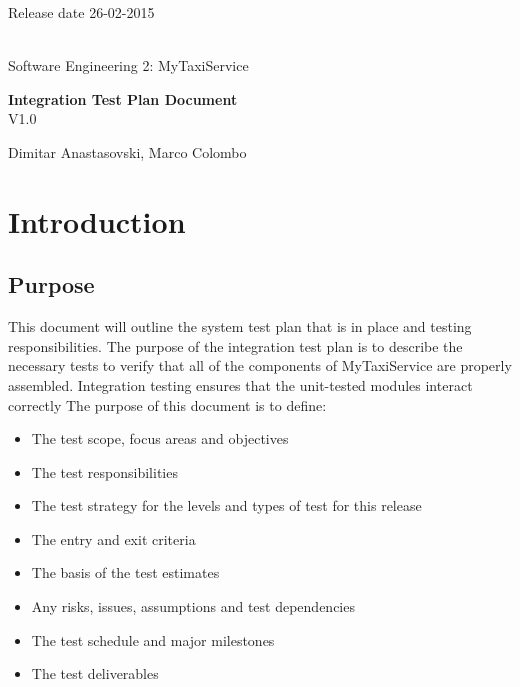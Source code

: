 \documentclass[12pt, oneside]{book}   	%
\begin{document}
\thispagestyle{empty}
\hspace{10cm}
Release date 26-02-2015
\\
\\
\begin{center}
{\huge Software Engineering 2:}
{\huge MyTaxiService}
\end{center}
\vspace*{\fill}
\begin{center}
\textbf{\huge Integration Test Plan Document} 
\\
\large{V1.0}
\end{center}
\vfill
\begin{center}
{\large Dimitar Anastasovski, Marco Colombo}
\end{center}
\clearpage
\pagestyle{plain}
\tableofcontents
\setcounter{page}{1}
\clearpage
\chapter{Introduction}
\section{Purpose}
This document will outline the system test plan that is in place and testing responsibilities. The purpose of the integration test plan is to describe the necessary tests to verify that all of the components of MyTaxiService are properly assembled.  Integration testing ensures that the unit-tested modules interact correctly
The purpose of this document is to define:
\begin{itemize}
\item The test scope, focus areas and objectives
\item The test responsibilities
\item The test strategy for the levels and types of test for this release
\item The entry and exit criteria
\item The basis of the test estimates
\item Any risks, issues, assumptions and test dependencies
\item The test schedule and major milestones
\item The test deliverables
\end{itemize}
\end{document}
